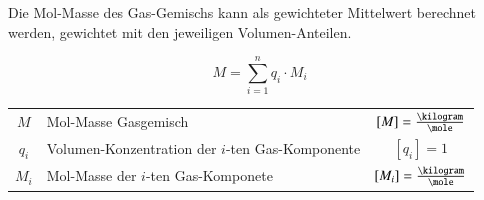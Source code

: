 Die Mol-Masse des Gas-Gemischs kann als gewichteter Mittelwert berechnet werden, gewichtet mit den jeweiligen Volumen-Anteilen.

$$ \boxed{ M = \sum_{i=1}^n  q_i \cdot M_i } $$

\renewcommand{\arraystretch}{1.3}
\begin{tabular}{c l c}
	$M$ 	& Mol-Masse Gasgemisch								& $[M] = \frac{\kilogram}{\mole}$ 	\\
	$q_i$ 	& Volumen-Konzentration der $i$-ten Gas-Komponente	& $[q_i] = 1$ 						\\
	$M_i$ 	& Mol-Masse der $i$-ten Gas-Komponete 				& $[M_i] = \frac{\kilogram}{\mole}$
\end{tabular}
\renewcommand{\arraystretch}{1}


\columnbreak
